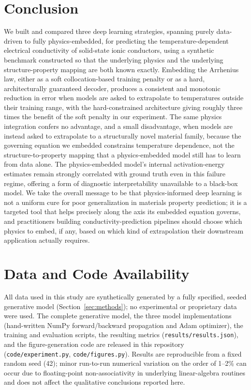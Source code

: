 \documentclass[11pt]{article}
\begin{document}
\section{Conclusion}

We built and compared three deep learning strategies, spanning purely data-driven to fully physics-embedded, for predicting the temperature-dependent electrical conductivity of solid-state ionic conductors, using a synthetic benchmark constructed so that the underlying physics and the underlying structure-property mapping are both known exactly. Embedding the Arrhenius law, either as a soft collocation-based training penalty or as a hard, architecturally guaranteed decoder, produces a consistent and monotonic reduction in error when models are asked to extrapolate to temperatures outside their training range, with the hard-constrained architecture giving roughly three times the benefit of the soft penalty in our experiment. The same physics integration confers no advantage, and a small disadvantage, when models are instead asked to extrapolate to a structurally novel material family, because the governing equation we embedded constrains temperature dependence, not the structure-to-property mapping that a physics-embedded model still has to learn from data alone. The physics-embedded model's internal activation-energy estimates remain strongly correlated with ground truth even in this failure regime, offering a form of diagnostic interpretability unavailable to a black-box model. We take the overall message to be that physics-informed deep learning is not a uniform cure for poor generalization in materials property prediction; it is a targeted tool that helps precisely along the axis its embedded equation governs, and practitioners building conductivity-prediction pipelines should choose which physics to embed, if any, based on which kind of extrapolation their downstream application actually requires.

\section*{Data and Code Availability}
All data used in this study are synthetically generated by a fully specified, seeded generative model (Section~\ref{sec:methods}); no experimental or proprietary data were used. The complete generative model, the three model implementations (hand-written NumPy forward/backward propagation and Adam optimizer), the training and evaluation scripts, the resulting metrics (\texttt{results/results.json}), and the figure-generation code are released in this repository (\texttt{code/experiment.py}, \texttt{code/figures.py}). Results are reproducible from a fixed random seed (42); minor run-to-run numerical variation on the order of 1--2\% can occur due to floating-point non-associativity in underlying linear-algebra routines and does not affect the qualitative conclusions reported here.
\end{document}
